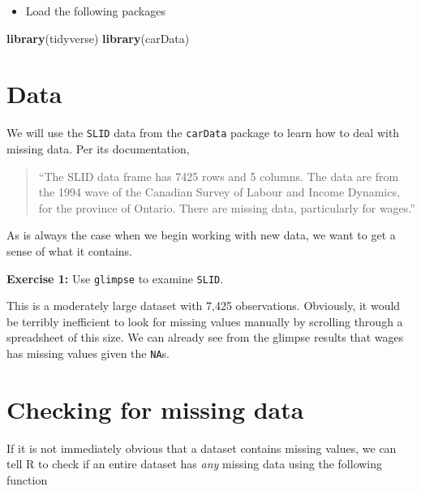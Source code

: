 \documentclass[
]{book}
\makeatletter
\newenvironment{Shaded}{\begin{snugshade}}{\end{snugshade}}
\newcommand{\FunctionTok}[1]{\textcolor[rgb]{0.27,0.27,0.27}{\textbf{#1}}}
\newcommand{\NormalTok}[1]{#1}
\providecommand{\tightlist}{%
  \setlength{\itemsep}{0pt}\setlength{\parskip}{0pt}}
\newenvironment{kframe}{%
\medskip{}
\setlength{\fboxsep}{.8em}
 \def\at@end@of@kframe{}%
 \ifinner\ifhmode%
  \def\at@end@of@kframe{\end{minipage}}%
  \begin{minipage}{\columnwidth}%
 \fi\fi%
 \def\FrameCommand##1{\hskip\@totalleftmargin \hskip-\fboxsep
 \colorbox{shadecolor}{##1}\hskip-\fboxsep
     \hskip-\linewidth \hskip-\@totalleftmargin \hskip\columnwidth}%
 \MakeFramed {\advance\hsize-\width
   \@totalleftmargin\z@ \linewidth\hsize
   \@setminipage}}%
 {\par\unskip\endMakeFramed%
 \at@end@of@kframe}
\renewenvironment{Shaded}{\begin{kframe}}{\end{kframe}}
\newenvironment{rmdblock}[1]
  {\begin{shaded*}
  }
  {\end{shaded*}
  }
\newenvironment{learncheck}
  {\begin{rmdblock}{warning}}
  {\end{rmdblock}}
\makeatother
\begin{document}
\begin{itemize}
\tightlist
\item
  Load the following packages
\end{itemize}

\begin{Shaded}
\begin{Highlighting}[]
\FunctionTok{library}\NormalTok{(tidyverse)}
\FunctionTok{library}\NormalTok{(carData)}
\end{Highlighting}
\end{Shaded}

\hypertarget{data-1}{%
\section{Data}\label{data-1}}

We will use the \texttt{SLID} data from the \texttt{carData} package to learn how to deal with missing data. Per its documentation,

\begin{quote}
``The SLID data frame has 7425 rows and 5 columns. The data are from the 1994 wave of the Canadian Survey of Labour and Income Dynamics, for the province of Ontario. There are missing data, particularly for wages.''
\end{quote}

As is always the case when we begin working with new data, we want to get a sense of what it contains.

\begin{learncheck}
\textbf{Exercise 1:} Use \texttt{glimpse} to examine \texttt{SLID}.
\end{learncheck}

This is a moderately large dataset with 7,425 observations. Obviously, it would be terribly inefficient to look for missing values manually by scrolling through a spreadsheet of this size. We can already see from the glimpse results that wages has missing values given the \texttt{NA}s.

\hypertarget{checking-for-missing-data}{%
\section{Checking for missing data}\label{checking-for-missing-data}}

If it is not immediately obvious that a dataset contains missing values, we can tell R to check if an entire dataset has \emph{any} missing data using the following function
\end{document}
